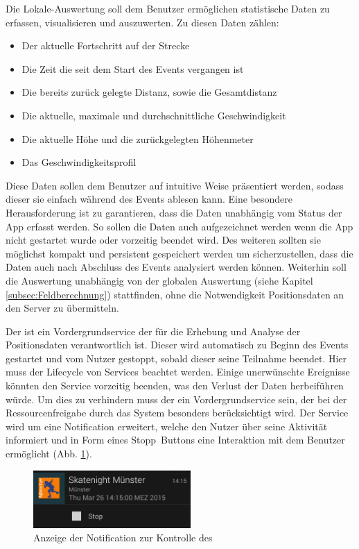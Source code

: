Die Lokale-Auswertung soll dem Benutzer ermöglichen statistische Daten zu erfassen, visualisieren und auszuwerten. 
Zu diesen Daten zählen: 

\begin{itemize}
	\item Der aktuelle Fortschritt auf der Strecke
	\item Die Zeit die seit dem Start des Events vergangen ist
	\item Die bereits zurück gelegte Distanz, sowie die Gesamtdistanz
	\item Die aktuelle, maximale und durchschnittliche Geschwindigkeit
	\item Die aktuelle Höhe und die zurückgelegten Höhenmeter
	\item Das Geschwindigkeitsprofil
\end{itemize}

Diese Daten sollen dem Benutzer auf intuitive Weise präsentiert werden, sodass dieser sie einfach während des Events ablesen kann. Eine besondere Herausforderung ist zu garantieren, dass die Daten unabhängig vom Status der App erfasst werden. So sollen die Daten auch aufgezeichnet werden wenn die App nicht gestartet wurde oder vorzeitig beendet wird. Des weiteren sollten sie möglichst kompakt und persistent gespeichert werden um sicherzustellen, dass die Daten auch nach Abschluss des Events analysiert werden können. Weiterhin soll die Auswertung unabhängig von der globalen Auswertung (siehe Kapitel \ref{subsec:Feldberechnung}) stattfinden, ohne die Notwendigkeit Positionsdaten an den Server zu übermitteln.

Der  ist ein Vordergrundservice der für die Erhebung und Analyse der Positionsdaten verantwortlich ist. Dieser wird automatisch zu Beginn des Events gestartet und vom Nutzer gestoppt, sobald dieser seine Teilnahme beendet. Hier muss der Lifecycle von Services beachtet werden.  Einige unerwünschte Ereignisse könnten den Service vorzeitig beenden, was den Verlust der Daten herbeiführen würde. Um dies zu verhindern muss der  ein Vordergrundservice sein, der bei der Ressourcenfreigabe durch das System besonders berücksichtigt wird. Der Service wird um eine Notification erweitert, welche den Nutzer über seine Aktivität informiert und in Form eines \glqq Stopp\grqq\ Buttons eine Interaktion mit dem Benutzer ermöglicht (Abb. \ref{fig:LokaleAuswertungNotification}).

\begin{figure}[htb]
\centering
\includegraphics[width=6cm]{graphics/LokaleAuswertung_Notification.png}
\caption{Anzeige der Notification zur Kontrolle des }
\label{fig:LokaleAuswertungNotification}
\end{figure}


